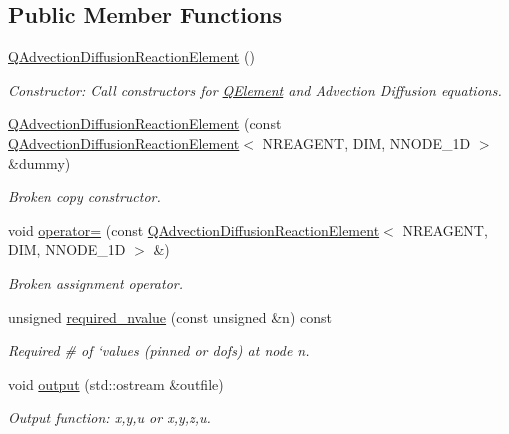 \subsection*{Public Member Functions}
\begin{DoxyCompactItemize}
\item 
\hyperlink{classoomph_1_1QAdvectionDiffusionReactionElement_add22bb19f8f4a185e0e7820c7f43121f}{Q\+Advection\+Diffusion\+Reaction\+Element} ()
\begin{DoxyCompactList}\small\item\em Constructor\+: Call constructors for \hyperlink{classoomph_1_1QElement}{Q\+Element} and Advection Diffusion equations. \end{DoxyCompactList}\item 
\hyperlink{classoomph_1_1QAdvectionDiffusionReactionElement_a4a319e1d78394fd5db9b9d63ca14cd1b}{Q\+Advection\+Diffusion\+Reaction\+Element} (const \hyperlink{classoomph_1_1QAdvectionDiffusionReactionElement}{Q\+Advection\+Diffusion\+Reaction\+Element}$<$ N\+R\+E\+A\+G\+E\+NT, D\+IM, N\+N\+O\+D\+E\+\_\+1D $>$ \&dummy)
\begin{DoxyCompactList}\small\item\em Broken copy constructor. \end{DoxyCompactList}\item 
void \hyperlink{classoomph_1_1QAdvectionDiffusionReactionElement_a0c4f00cf6b1cd8a0bb0ec505ed319807}{operator=} (const \hyperlink{classoomph_1_1QAdvectionDiffusionReactionElement}{Q\+Advection\+Diffusion\+Reaction\+Element}$<$ N\+R\+E\+A\+G\+E\+NT, D\+IM, N\+N\+O\+D\+E\+\_\+1D $>$ \&)
\begin{DoxyCompactList}\small\item\em Broken assignment operator. \end{DoxyCompactList}\item 
unsigned \hyperlink{classoomph_1_1QAdvectionDiffusionReactionElement_ac6a740436c52b5c541c1758508be0710}{required\+\_\+nvalue} (const unsigned \&n) const
\begin{DoxyCompactList}\small\item\em Required \# of `values\textquotesingle{} (pinned or dofs) at node n. \end{DoxyCompactList}\item 
void \hyperlink{classoomph_1_1QAdvectionDiffusionReactionElement_abea67b1715ee4b70086ee68dcddbc0b1}{output} (std\+::ostream \&outfile)
\begin{DoxyCompactList}\small\item\em Output function\+: x,y,u or x,y,z,u. \end{DoxyCompactList}\item 

\end{DoxyCompactItemize}
